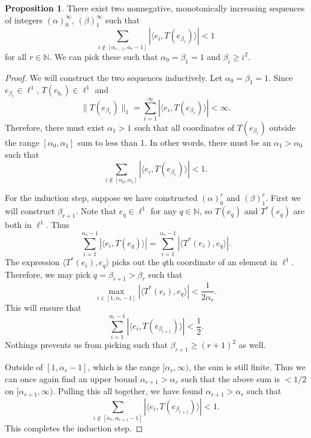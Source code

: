 \documentclass{dcthesis}
\numberwithin{equation}{section}
\numberwithin{equation}{section}
\theoremstyle{definition}
\newtheorem{proposition}[equation]{Proposition}
\begin{document}
\begin{proposition}
\label{prop_two_sequences}
	There exist two nonnegative, monotonically increasing sequences of integers $(\alpha)_0^\infty$, $(\beta)_1^\infty$ such that 
	\[
		\sum_{i\not\in [\alpha_{r-1}, \alpha_r-1]}|\langle e_i, T(e_{\beta_r})\rangle |<1
	\]
for all $r\in\mathbb{N}$. We can pick these such that $\alpha_0=\beta_1=1$ and $\beta_i\geq i^2$.
\end{proposition}
\begin{proof}
	We will construct the two sequences inductively. Let $\alpha_0=\beta_1=1$. Since $e_{\beta_r}\in\ell^1$, $T(e_{b_r})\in\ell^1$ and 
	\[
		\|T(e_{\beta_r})\|_1=\sum_{i=1}^\infty |\langle e_i,T(e_{\beta_r})\rangle |<\infty.
	\]
Therefore, there must exist $\alpha_1>1$ such that all coordinates of $T(e_{\beta_r})$ outside the range $[\alpha_0, \alpha_1]$ sum to less than 1. In other words, there must be an $\alpha_1>\alpha_0$ such that
	\[
		\sum_{i\not\in[\alpha_0,\alpha_1]}|\langle e_i, T(e_{\beta_r})\rangle |<1.
	\]

	For the induction step, suppose we have constructed $(\alpha)_0^r$ and $(\beta)_1^r$. First we will construct $\beta_{r+1}$. Note that $e_q\in\ell^1$ for any $q\in\mathbb{N}$, so $T(e_q)$ and $T^\ast (e_q)$ are both in $\ell^1$. Thus
	\[
	\sum_{i=1}^{\alpha_r-1}|\langle e_i, T(e_q)\rangle |=\sum_{i=1}^{\alpha_r-1}|\langle T^\ast (e_i), e_q\rangle |.
	\]
	The expression $\langle T^\ast (e_i), e_q\rangle $ picks out the $q$th coordinate of an element in $\ell^1$. Therefore, we may pick $q=\beta_{r+1}>\beta_r$ such that
	\begin{equation*}
		\max_{i\in[1,\alpha_r-1]}|\langle T^\ast (e_i),e_q\rangle |<\frac{1}{2\alpha_r}.
	\end{equation*}
	This will ensure that
	\[
		\sum_{i=1}^{\alpha_r-1}|\langle e_i, T(e_{\beta_{r+1}})\rangle |<\frac{1}{2}.
	\]
	Nothings prevents us from picking such that $\beta_{r+1}\geq (r+1)^2$ as well.

	Outside of $[1,\alpha_r-1]$, which is the range $[\alpha_r, \infty)$, the sum is still finite. Thus we can once again find an upper bound $\alpha_{r+1}>\alpha_r$ such that the above sum is $<1/2$ on $[\alpha_{r+1},\infty)$. Pulling this all together, we have found $\alpha_{r+1}>\alpha_r$ such that 
	\[
		\sum_{i\not\in[\alpha_{r}, \alpha_{r+1}-1]}|\langle e_i, T(e_{\beta_{r+1}})\rangle |<1.
	\]
	This completes the induction step.
\end{proof}

\end{document}
